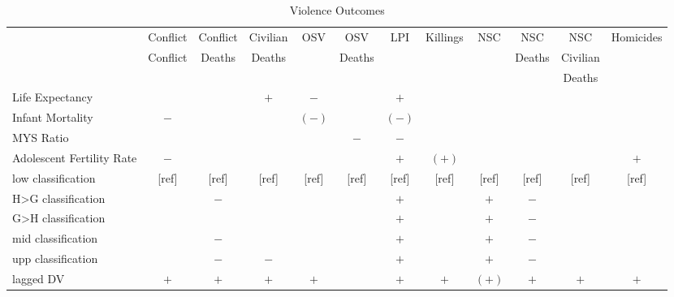 \begin{landscape}
\begin{table}[!htbp]
\centering
\caption{Violence Outcomes}
\label{table_violence}
\begin{tabular}{lccccccccccc}
\toprule
                          & Conflict       & Conflict & Civilian & OSV    & OSV    & LPI    & Killings & NSC      & NSC      & NSC      & Homicides \\
                          & Conflict       & Deaths   & Deaths   &        & Deaths &        &          &          & Deaths   & Civilian & \\
                          &                &          &          &        &        &        &          &          &          & Deaths   & \\
\midrule
Life Expectancy           &                &          & $+$      & $-$    &        & $+$    &          &          &          &          & \\
Infant Mortality          & $-$            &          &          & $(-)$  &        & $(-)$  &          &          &          &          & \\
MYS Ratio                 &                &          &          &        & $-$    & $-$    &          &          &          &          & \\
Adolescent Fertility Rate & $-$            &          &          &        &        & $+$    & $(+)$    &          &          &          & $+$ \\
low classification        & [ref]          & [ref]    & [ref]    & [ref]  & [ref]  & [ref]  & [ref]    & [ref]    & [ref]    & [ref]    & [ref] \\
H>G classification        &                & $-$      &          &        &        & $+$    &          & $+$      & $-$      &          & \\
G>H classification        &                &          &          &        &        & $+$    &          & $+$      & $-$      &          & \\
mid classification        &                & $-$      &          &        &        & $+$    &          & $+$      & $-$      &          & \\
upp classification        &                & $-$      & $-$      &        &        & $+$    &          & $+$      & $-$      &          & \\
lagged DV                 & $+$            & $+$      & $+$      & $+$    &        & $+$    & $+$      & $(+)$    & $+$      & $+$      & $+$ \\

\end{tabular}
\end{table}
\end{landscape}
